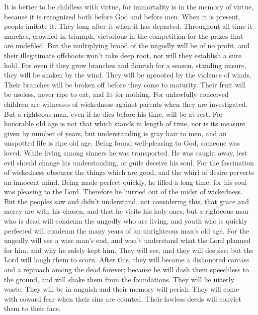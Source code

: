  It is better to be childless with virtue, for immortality
is in the memory of virtue, because it is recognized both before God and
before men.  When it is present, people imitate it. They
long after it when it has departed. Throughout all time it marches,
crowned in triumph, victorious in the competition for the prizes that
are undefiled.  But the multiplying brood of the ungodly
will be of no profit, and their illegitimate offshoots won't take deep
root, nor will they establish a sure hold.  For even if they
grow branches and flourish for a season, standing unsure, they will be
shaken by the wind. They will be uprooted by the violence of winds.
 Their branches will be broken off before they come to
maturity. Their fruit will be useless, never ripe to eat, and fit for
nothing.  For unlawfully conceived children are witnesses of
wickedness against parents when they are investigated.  But
a righteous man, even if he dies before his time, will be at rest.
 For honorable old age is not that which stands in length of
time, nor is its measure given by number of years,  but
understanding is gray hair to men, and an unspotted life is ripe old
age.  Being found well-pleasing to God, someone was loved.
While living among sinners he was transported.  He was
caught away, lest evil should change his understanding, or guile deceive
his soul.  For the fascination of wickedness obscures the
things which are good, and the whirl of desire perverts an innocent
mind.  Being made perfect quickly, he filled a long time;
 for his soul was pleasing to the Lord. Therefore he
hurried out of the midst of wickedness.  But the peoples
saw and didn't understand, not considering this, that grace and mercy
are with his chosen, and that he visits his holy ones;  but
a righteous man who is dead will condemn the ungodly who are living, and
youth who is quickly perfected will condemn the many years of an
unrighteous man's old age.  For the ungodly will see a wise
man's end, and won't understand what the Lord planned for him, and why
he safely kept him.  They will see, and they will despise;
but the Lord will laugh them to scorn. After this, they will become a
dishonored carcass and a reproach among the dead forever; 
because he will dash them speechless to the ground, and will shake them
from the foundations. They will lie utterly waste. They will be in
anguish and their memory will perish.  They will come with
coward fear when their sins are counted. Their lawless deeds will
convict them to their face.

